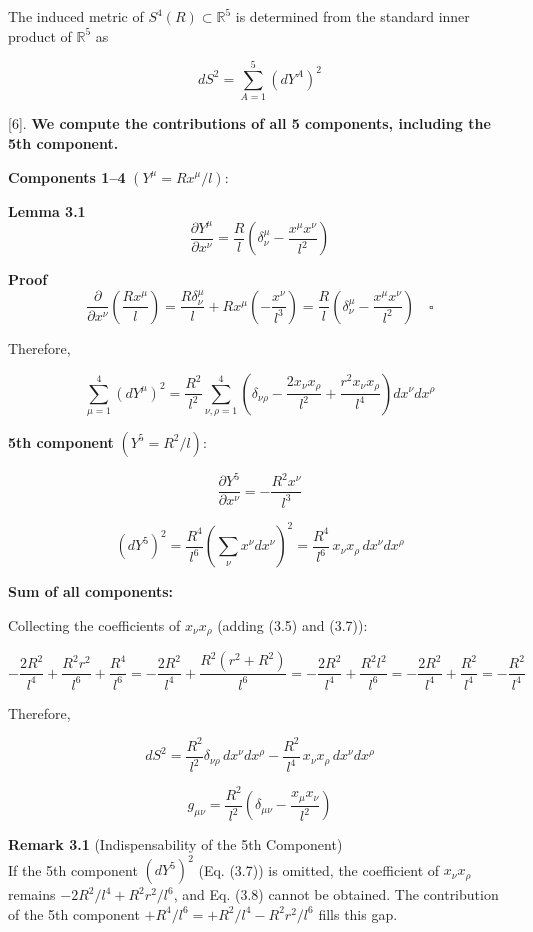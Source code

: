 \documentclass[a4paper,11pt]{article}
\theoremstyle{definition}
\begin{document}
The induced metric of \(S^4(R) \subset \mathbb{R}^5\) is determined from the standard inner product of \(\mathbb{R}^5\) as

\[dS^2 = \sum_{A=1}^{5} (dY^A)^2 \tag{3.3}\]

{[}6{]}. \textbf{We compute the contributions of all 5 components, including the 5th component.}

\textbf{Components 1--4} \((Y^\mu = R x^\mu / l)\):

\textbf{Lemma 3.1}\\
\[\frac{\partial Y^\mu}{\partial x^\nu} = \frac{R}{l}\left(\delta^\mu_\nu - \frac{x^\mu x^\nu}{l^2}\right) \tag{3.4}\]

\textbf{Proof}\\
\[\frac{\partial}{\partial x^\nu}\!\left(\frac{Rx^\mu}{l}\right) = \frac{R\delta^\mu_\nu}{l} + Rx^\mu\!\left(-\frac{x^\nu}{l^3}\right) = \frac{R}{l}\!\left(\delta^\mu_\nu - \frac{x^\mu x^\nu}{l^2}\right) \quad \square\]

Therefore,

\[\sum_{\mu=1}^4(dY^\mu)^2 = \frac{R^2}{l^2}\sum_{\nu,\rho=1}^{4}\left(\delta_{\nu\rho} - \frac{2x_\nu x_\rho}{l^2} + \frac{r^2 x_\nu x_\rho}{l^4}\right)dx^\nu dx^\rho \tag{3.5}\]

\textbf{5th component} \((Y^5 = R^2/l)\):

\[\frac{\partial Y^5}{\partial x^\nu} = -\frac{R^2 x^\nu}{l^3} \tag{3.6}\]

\[\left(dY^5\right)^2 = \frac{R^4}{l^6}\left(\sum_\nu x^\nu dx^\nu\right)^2 = \frac{R^4}{l^6}\,x_\nu x_\rho\,dx^\nu dx^\rho \tag{3.7}\]

\textbf{Sum of all components:}

Collecting the coefficients of \(x_\nu x_\rho\) (adding (3.5) and (3.7)):

\[-\frac{2R^2}{l^4} + \frac{R^2 r^2}{l^6} + \frac{R^4}{l^6} = -\frac{2R^2}{l^4} + \frac{R^2(r^2+R^2)}{l^6} = -\frac{2R^2}{l^4} + \frac{R^2 l^2}{l^6} = -\frac{2R^2}{l^4} + \frac{R^2}{l^4} = -\frac{R^2}{l^4}\]

Therefore,

\[dS^2 = \frac{R^2}{l^2}\delta_{\nu\rho}\,dx^\nu dx^\rho - \frac{R^2}{l^4}\,x_\nu x_\rho\,dx^\nu dx^\rho\]

\[\boxed{g_{\mu\nu} = \frac{R^2}{l^2}\left(\delta_{\mu\nu} - \frac{x_\mu x_\nu}{l^2}\right)} \tag{3.8}\]

\textbf{Remark 3.1} (Indispensability of the 5th Component)\\
If the 5th component \((dY^5)^2\) (Eq. (3.7)) is omitted, the coefficient of \(x_\nu x_\rho\) remains \(-2R^2/l^4 + R^2 r^2/l^6\), and Eq. (3.8) cannot be obtained. The contribution of the 5th component \(+R^4/l^6 = +R^2/l^4 - R^2 r^2/l^6\) fills this gap.
\end{document}
